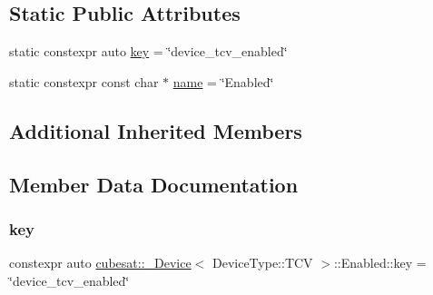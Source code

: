 \subsection*{Static Public Attributes}
\begin{DoxyCompactItemize}
\item 
static constexpr auto \hyperlink{structcubesat_1_1__Device_3_01DeviceType_1_1TCV_01_4_1_1Enabled_a11fea8a37d14cdfb3558d91219869c19}{key} = \char`\"{}device\+\_\+tcv\+\_\+enabled\char`\"{}
\item 
static constexpr const char $\ast$ \hyperlink{structcubesat_1_1__Device_3_01DeviceType_1_1TCV_01_4_1_1Enabled_a0ab82725f70d56a8ed8f144d0f8cd175}{name} = \char`\"{}Enabled\char`\"{}
\end{DoxyCompactItemize}
\subsection*{Additional Inherited Members}


\subsection{Member Data Documentation}
\mbox{\label{structcubesat_1_1__Device_3_01DeviceType_1_1TCV_01_4_1_1Enabled_a11fea8a37d14cdfb3558d91219869c19}} 
\subsubsection{\texorpdfstring{key}{key}}
{\footnotesize\ttfamily constexpr auto \hyperlink{structcubesat_1_1__Device}{cubesat\+::\+\_\+\+Device}$<$ Device\+Type\+::\+T\+CV $>$\+::Enabled\+::key = \char`\"{}device\+\_\+tcv\+\_\+enabled\char`\"{}\hspace{0.3cm}{\ttfamily [static]}}

\mbox{\label{structcubesat_1_1__Device_3_01DeviceType_1_1TCV_01_4_1_1Enabled_a0ab82725f70d56a8ed8f144d0f8cd175}} 
